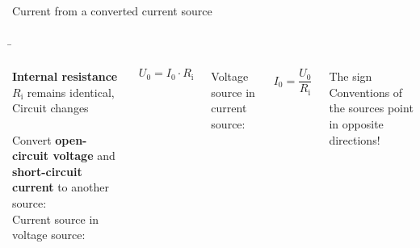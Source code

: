 \begin{frame}
{\begin{Key point}{Current from a converted current source}{}
		\end{Key point}
		
	}
	

	
	\b{
	
	
		\begin{columns}
			
			\textbf{Internal resistance} $R_\mathrm{i}$ remains identical,\\
			Circuit changes\\
			
			\phantom{.}\\
			
			Convert \textbf{open-circuit voltage} and \textbf{short-circuit current} to another source:			
			\phantom{text}\\
			
			Current source in voltage source:
			
			\begin{equation*}
				U_0 = I_0 \cdot R_\mathrm{i}
			\end{equation*}
			
			Voltage source in current source:
			
			\begin{equation*}
				I_0 = \frac{U_0}{R_\mathrm{i}}
			\end{equation*}
			
			The sign Conventions of the sources point in opposite directions! 

			
			
			
			\vspace*{-15pt}
\end{columns}}
\end{frame}
